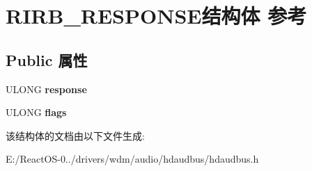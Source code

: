 \hypertarget{struct_r_i_r_b___r_e_s_p_o_n_s_e}{}\section{R\+I\+R\+B\+\_\+\+R\+E\+S\+P\+O\+N\+S\+E结构体 参考}
\label{struct_r_i_r_b___r_e_s_p_o_n_s_e}
\subsection*{Public 属性}
\begin{DoxyCompactItemize}
\item 
\mbox{\label{struct_r_i_r_b___r_e_s_p_o_n_s_e_a4bd8ded029d74f32412d0b7b96a380a3}} 
U\+L\+O\+NG {\bfseries response}
\item 
\mbox{\label{struct_r_i_r_b___r_e_s_p_o_n_s_e_a6f1f19117bdefc8078c7af7ddea2a531}} 
U\+L\+O\+NG {\bfseries flags}
\end{DoxyCompactItemize}


该结构体的文档由以下文件生成\+:\begin{DoxyCompactItemize}
\item 
E\+:/\+React\+O\+S-\/0../drivers/wdm/audio/hdaudbus/hdaudbus.\+h\end{DoxyCompactItemize}
